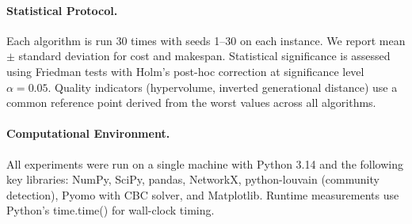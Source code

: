\paragraph{Statistical Protocol.}
Each algorithm is run 30 times with seeds 1--30 on each instance.
We report mean $\pm$ standard deviation for cost and makespan.
Statistical significance is assessed using Friedman tests with Holm's post-hoc correction at significance level $\alpha = 0.05$.
Quality indicators (hypervolume, inverted generational distance) use a common reference point derived from the worst values across all algorithms.

\paragraph{Computational Environment.}
All experiments were run on a single machine with Python 3.14 and the following key libraries: NumPy, SciPy, pandas, NetworkX, python-louvain (community detection), Pyomo with CBC solver, and Matplotlib.
Runtime measurements use Python's {\ttfamily time.time()} for wall-clock timing.
